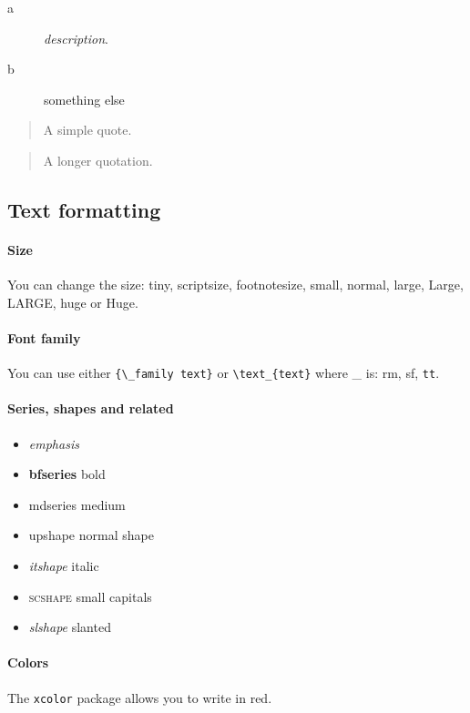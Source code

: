 \begin{description}
\item[a] \emph{description}.
\item[b] something else
\end{description}

\begin{quote}
A simple quote.
\end{quote}

\begin{quotation}
A longer quotation.
\end{quotation}

\subsection{Text formatting}

\paragraph{Size}
You can change the size: {\tiny tiny}, {\scriptsize scriptsize}, {\footnotesize
footnotesize}, {\small small}, {\normalsize normal}, {\large large}, {\Large
Large}, {\LARGE LARGE}, {\huge huge} or {\Huge Huge}.

\paragraph{Font family}
You can use either \lstinline${\_family text}$ or \lstinline$\text_{text}$ where
\_ is: \textrm{rm}, \textsf{sf}, \texttt{tt}.

\paragraph{Series, shapes and related}
\begin{itemize}
\item \emph{emphasis}
\item {\bfseries bfseries} bold
\item {\mdseries mdseries} medium
\item {\upshape upshape} normal shape
\item {\itshape itshape} italic
\item {\scshape scshape} small capitals
\item {\slshape slshape} slanted 
\end{itemize}

\paragraph{Colors}
The \texttt{xcolor} package allows you to write {\color{red} in red}.

